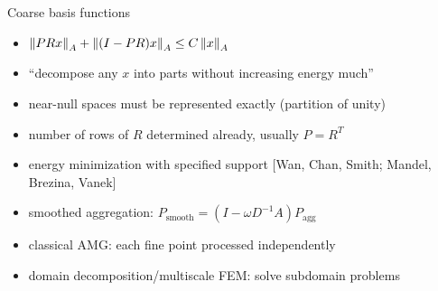 \begin{frame}{Coarse basis functions}
  \begin{itemize}
  \item $\left\lVert PR x \right\rVert_A + \left\lVert (I - PR)x \right\rVert_A \le C \left\lVert x \right\rVert_A$
  \item ``decompose any $x$ into parts without increasing energy much''
  \item near-null spaces must be represented exactly (partition of unity)
  \item number of rows of $R$ determined already, usually $P = R^T$
  \item energy minimization with specified support [Wan, Chan, Smith; Mandel, Brezina, Vanek]
  \item smoothed aggregation: $P_{\text{smooth}} = (I - \omega D^{-1} A) P_{\text{agg}}$
  \item classical AMG: each fine point processed independently
  \item domain decomposition/multiscale FEM: solve subdomain problems
  \end{itemize}
\end{frame}
